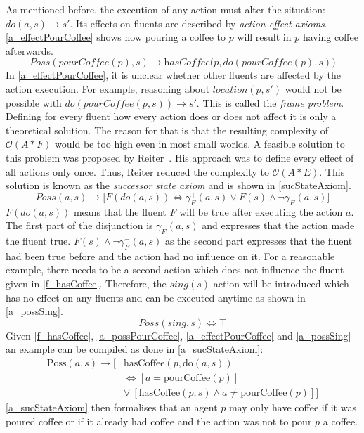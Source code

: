 As mentioned before, the execution of any action must alter the situation: $\textit{do}(a,s) \rightarrow s'$. Its effects on fluents are described by \emph{action effect axioms}. \autoref{a_effectPourCoffee} shows how pouring a coffee to $p$ will result in $p$ having coffee afterwards.
\begin{equation}\label{a_effectPourCoffee}
  \textit{Poss}(\textit{pourCoffee}(p),s) \rightarrow \textit{hasCoffee}\big(p,\textit{do}(\textit{pourCoffee}(p),s)\big)
\end{equation}
In \autoref{a_effectPourCoffee}, it is unclear whether other fluents are affected by the action execution. For example, reasoning about $location(p,s')$ would not be possible with $\textit{do}(\textit{pourCoffee}(p,s)) \rightarrow s'$. This is called the \emph{frame problem}. Defining for every fluent how every action does or does not affect it is only a theoretical solution. The reason for that is that the resulting complexity of $\mathcal{O}(A*F)$ would be too high even in most small worlds. A feasible solution to this problem was proposed by Reiter~\cite{reiter_frame_1991}. His approach was to define every effect of all actions only once. Thus, Reiter reduced the complexity to $\mathcal{O}(A*E)$. This solution is known as the \emph{successor state axiom} and is shown in \autoref{sucStateAxiom}.
\begin{equation}\label{sucStateAxiom}
  \mathit{Poss}(a,s)\rightarrow \big[\mathit{F}(\mathit{do}(a,s)) \Leftrightarrow\gamma_\mathit{F}^+(a,s)\vee\mathit{F}(s)\wedge\neg\gamma_\mathit{F}^-(a,s)\big]
\end{equation}
$\mathit{F}(\mathit{do}(a,s))$ means that the fluent $F$ will be true after executing the action $a$. The first part of the disjunction is $\gamma_\mathit{F}^+(a,s)$ and expresses that the action made the fluent true. $\mathit{F}(s)\wedge\neg\gamma_\mathit{F}^-(a,s)$ as the second part expresses that the fluent had been true before and the action had no influence on it. For a reasonable example, there needs to be a second action which does not influence the fluent given in \autoref{f_hasCoffee}. Therefore, the $sing(s)$ action will be introduced which has no effect on any fluents and can be executed anytime as shown in \autoref{a_possSing}.
\begin{equation}\label{a_possSing}
  \mathit{Poss}(\mathit{sing}, s) \Leftrightarrow \top
\end{equation}
Given \autoref{f_hasCoffee}, \ref{a_possPourCoffee}, \ref{a_effectPourCoffee} and \ref{a_possSing} an example can be compiled as done in \autoref{a_sucStateAxiom}:
\begin{equation}\label{a_sucStateAxiom}
  \begin{split}
    \mathrm{Poss}(a,s)\rightarrow \big[&\mathrm{hasCoffee}(p,\mathrm{do}(a,s))
\\    &\Leftrightarrow [a=\mathrm{pourCoffee}(p)]
\\    &\vee\ [\mathrm{hasCoffee}(p,s) \wedge a\neq \mathrm{pourCoffee}(p)]\big]
  \end{split}
\end{equation}
\autoref{a_sucStateAxiom} then formalises that an agent $p$ may only have coffee if it was poured coffee or if it already had coffee and the action was not to pour $p$ a coffee.
